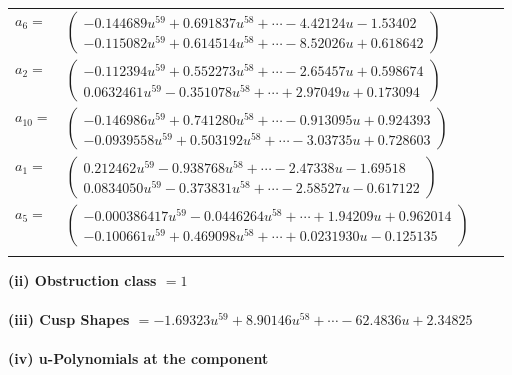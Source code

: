 \documentclass[1p]{elsarticle_modified}
\theoremstyle{definition}
\begin{document}
\begin{tabular}{m{7pt} m{180pt} m{7pt} m{180pt} }
\flushright $a_{6}=$&$\begin{pmatrix}-0.144689 u^{59}+0.691837 u^{58}+\cdots-4.42124 u-1.53402\\-0.115082 u^{59}+0.614514 u^{58}+\cdots-8.52026 u+0.618642\end{pmatrix}$ \\
\flushright $a_{2}=$&$\begin{pmatrix}-0.112394 u^{59}+0.552273 u^{58}+\cdots-2.65457 u+0.598674\\0.0632461 u^{59}-0.351078 u^{58}+\cdots+2.97049 u+0.173094\end{pmatrix}$ \\
\flushright $a_{10}=$&$\begin{pmatrix}-0.146986 u^{59}+0.741280 u^{58}+\cdots-0.913095 u+0.924393\\-0.0939558 u^{59}+0.503192 u^{58}+\cdots-3.03735 u+0.728603\end{pmatrix}$ \\
\flushright $a_{1}=$&$\begin{pmatrix}0.212462 u^{59}-0.938768 u^{58}+\cdots-2.47338 u-1.69518\\0.0834050 u^{59}-0.373831 u^{58}+\cdots-2.58527 u-0.617122\end{pmatrix}$ \\
\flushright $a_{5}=$&$\begin{pmatrix}-0.000386417 u^{59}-0.0446264 u^{58}+\cdots+1.94209 u+0.962014\\-0.100661 u^{59}+0.469098 u^{58}+\cdots+0.0231930 u-0.125135\end{pmatrix}$\\&\end{tabular}
\flushleft \textbf{(ii) Obstruction class $= 1$}\\~\\
\flushleft \textbf{(iii) Cusp Shapes $= -1.69323 u^{59}+8.90146 u^{58}+\cdots-62.4836 u+2.34825$}\\~\\
\newpage\renewcommand{\arraystretch}{1}
\flushleft \textbf{(iv) u-Polynomials at the component}\newline \\
\end{document}
